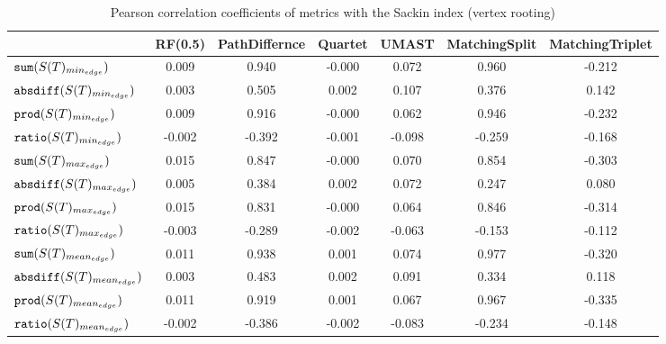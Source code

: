\begin{table}[h]
\centering
\caption{Pearson correlation coefficients of metrics with the Sackin index (vertex rooting)}
\begin{tabular}{lcccccc}
 & RF(0.5) & PathDiffernce & Quartet & UMAST & MatchingSplit & MatchingTriplet \\
\hline
${\verb+sum+}(S(T)_{min_{edge}})$ & 0.009 & 0.940 & -0.000 & 0.072 & 0.960 & -0.212 \\
${\verb+absdiff+}(S(T)_{min_{edge}})$ & 0.003 & 0.505 & 0.002 & 0.107 & 0.376 & 0.142 \\
${\verb+prod+}(S(T)_{min_{edge}})$ & 0.009 & 0.916 & -0.000 & 0.062 & 0.946 & -0.232 \\
${\verb+ratio+}(S(T)_{min_{edge}})$ & -0.002 & -0.392 & -0.001 & -0.098 & -0.259 & -0.168 \\
${\verb+sum+}(S(T)_{max_{edge}})$ & 0.015 & 0.847 & -0.000 & 0.070 & 0.854 & -0.303 \\
${\verb+absdiff+}(S(T)_{max_{edge}})$ & 0.005 & 0.384 & 0.002 & 0.072 & 0.247 & 0.080 \\
${\verb+prod+}(S(T)_{max_{edge}})$ & 0.015 & 0.831 & -0.000 & 0.064 & 0.846 & -0.314 \\
${\verb+ratio+}(S(T)_{max_{edge}})$ & -0.003 & -0.289 & -0.002 & -0.063 & -0.153 & -0.112 \\
${\verb+sum+}(S(T)_{mean_{edge}})$ & 0.011 & 0.938 & 0.001 & 0.074 & 0.977 & -0.320 \\
${\verb+absdiff+}(S(T)_{mean_{edge}})$ & 0.003 & 0.483 & 0.002 & 0.091 & 0.334 & 0.118 \\
${\verb+prod+}(S(T)_{mean_{edge}})$ & 0.011 & 0.919 & 0.001 & 0.067 & 0.967 & -0.335 \\
${\verb+ratio+}(S(T)_{mean_{edge}})$ & -0.002 & -0.386 & -0.002 & -0.083 & -0.234 & -0.148 \\
\end{tabular}
\end{table}

